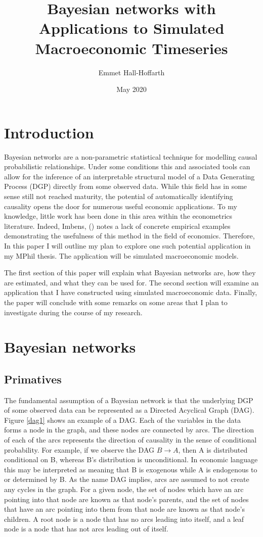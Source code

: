 \documentclass{article}
\title{Bayesian networks with Applications to Simulated Macroeconomic Timeseries}
\author{Emmet Hall-Hoffarth}
\date{May 2020}
\begin{document}
\maketitle

\section{Introduction}
Bayesian networks \parencite{pearl2018book} \parencite{pearl2009causality} are a non-parametric statistical technique for modelling causal probabilistic relationships. Under some conditions this and associated tools can allow for the inference of an interpretable structural model of a Data Generating Process (DGP) directly from some observed data. While this field has in some sense still not reached maturity, the potential of automatically identifying causality opens the door for numerous useful economic applications. To my knowledge, little work has been done in this area within the econometrics literature. Indeed, Imbens, (\citeyear{imbens2019potential}) notes a lack of concrete empirical examples demonstrating the usefulness of this method in the field of economics. Therefore, In this paper I will outline my plan to explore one such potential application in my MPhil thesis. The application will be simulated macroeconomic models.

The first section of this paper will explain what Bayesian networks are, how they are estimated, and what they can be used for. The second section will examine an application that I have constructed using simulated macroeconomic data. Finally, the paper will conclude with some remarks on some areas that I plan to investigate during the course of my research. 

\section{Bayesian networks}

\subsection{Primatives} \label{prim}

The fundamental assumption of a Bayesian network is that the underlying DGP of some observed data can be represented as a Directed Acyclical Graph (DAG). Figure \ref{dag1} shows an example of a DAG. Each of the variables in the data forms a node in the graph, and these nodes are connected by arcs. The direction of each of the arcs represents the direction of causality in the sense of conditional probability. For example, if we observe the DAG $B \rightarrow A$, then A is distributed conditional on B, whereas B's distribution is unconditional. In economic language this may be interpreted as meaning that B is exogenous while A is endogenous to or determined by B. As the name DAG implies, arcs are assumed to not create any cycles in the graph. For a given node, the set of nodes which have an arc pointing into that node are known as that node's parents, and the set of nodes that have an arc pointing into them from that node are known as that node's children. A root node is a node that has no arcs leading into itself, and a leaf node is a node that has not arcs leading out of itself.
\end{document}
